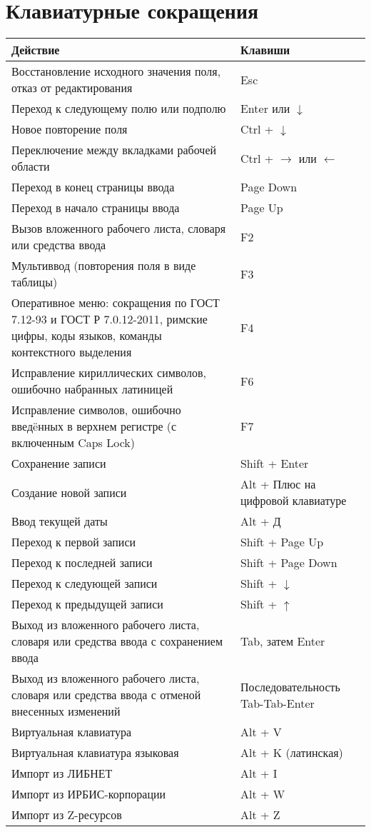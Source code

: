 \chapter{Клавиатурные сокращения}

\begin{tabularx}{\linewidth}{| X | l |}
	\hline
	\textbf{Действие} & \textbf{Клавиши} \\
	\hline
	Восстановление исходного значения поля, отказ от редактирования & Esc \\
	\hline
	Переход к следующему полю или подполю & Enter или $\downarrow$ \\
	\hline
	Новое повторение поля & Ctrl + $\downarrow$ \\
	\hline
	Переключение между вкладками рабочей области & Ctrl + $\rightarrow$ или $\leftarrow$ \\
	\hline
	Переход в конец страницы ввода & Page Down \\
	\hline
	Переход в начало страницы ввода & Page Up \\
	\hline
	Вызов вложенного рабочего листа, словаря или средства ввода & F2 \\
	\hline
	Мультиввод (повторения поля в виде таблицы) & F3 \\
	\hline
	Оперативное меню: сокращения по ГОСТ 7.12-93 и ГОСТ Р 7.0.12-2011, римские цифры, коды языков, команды контекстного выделения & F4 \\
	\hline
	Исправление кириллических символов, ошибочно набранных латиницей & F6 \\
	\hline
	Исправление символов, ошибочно введ\"eнных в верхнем регистре (с включенным Caps Lock) & F7 \\
	\hline
	Сохранение записи & Shift + Enter \\
	\hline
	Создание новой записи & Alt + Плюс на цифровой клавиатуре \\
	\hline
	Ввод текущей даты & Alt + Д \\
	\hline	
	Переход к первой записи & Shift + Page Up \\
	\hline
	Переход к последней записи & Shift + Page Down \\
	\hline
	Переход к следующей записи & Shift + $\downarrow$ \\
	\hline
	Переход к предыдущей записи & Shift + $\uparrow$ \\
	\hline
	Выход из вложенного рабочего листа, словаря или средства ввода с сохранением ввода & Tab, затем Enter \\
	\hline
	Выход из вложенного рабочего листа, словаря или средства ввода с отменой внесенных изменений & Последовательность Tab-Tab-Enter \\
	\hline
	Виртуальная клавиатура & Alt + V \\
	\hline
	Виртуальная клавиатура языковая & Alt + K (латинская) \\
	\hline
	Импорт из ЛИБНЕТ & Alt + I \\
	\hline
	Импорт из ИРБИС-корпорации & Alt + W \\
	\hline
	Импорт из Z-ресурсов & Alt + Z \\
	\hline
\end{tabularx}

